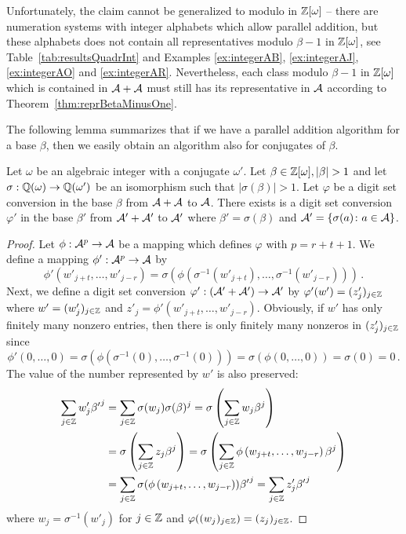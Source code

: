 Unfortunately, the claim cannot be generalized to modulo in $\mathbb{Z}[\omega]$ -- there are numeration systems with integer alphabets which allow parallel addition, but these alphabets does not contain all representatives modulo $\beta-1$ in $\mathbb{Z}[\omega]$, see Table~\ref{tab:resultsQuadrInt} and Examples \ref{ex:integerAB},  \ref{ex:integerAJ}, \ref{ex:integerAO} and \ref{ex:integerAR}. Nevertheless, each class modulo $\beta -1$ in $\mathbb{Z}[\omega]$ which is contained in $\mathcal{A}+\mathcal{A}$ must still has its representative in $\mathcal{A}$ according to Theorem~\ref{thm:reprBetaMinusOne}.

The following lemma summarizes that if we have a parallel addition algorithm for a base $\beta$, then we easily obtain an algorithm also for conjugates of $\beta$.
\begin{lem}
\label{lem:parAddAlgForConjugate}
Let $\omega$ be an algebraic integer with a conjugate $\omega'$. Let $\beta\in\Zomega, |\beta|>1$ and let $\sigma:\mathbb{Q}(\omega)\rightarrow \mathbb{Q}(\omega')$ be an isomorphism such that $|\sigma(\beta)|>1$. Let $\varphi$ be a digit set conversion  in the base $\beta$ from $\mathcal{A}+\mathcal{A}$ to $\mathcal{A}$. There exists  is a digit set conversion $\varphi'$ in the base $\beta'$ from $\mathcal{A}'+\mathcal{A}'$ to $\mathcal{A}'$ where $\beta'=\sigma(\beta)$ and $\mathcal{A}'=\{\sigma(a) \colon a\in\mathcal{A}\}$.
\end{lem}
\begin{proof}
Let $\phi:\mathcal{A}^p\rightarrow\mathcal{A}$ be a mapping which defines $\varphi$ with $p=r+t+1$. We define a mapping $\phi':\mathcal{A}^p\rightarrow \mathcal{A}$ by 
$$
\phi'(w'_{j+t}, \dots, w'_{j-r})=\sigma\left(\phi\left(\sigma^{-1}(w'_{j+t}), \dots, \sigma^{-1}(w'_{j-r})\right)\right)\,.
$$
Next, we define a digit set conversion  $\varphi':(\mathcal{A}'+\mathcal{A}')\rightarrow\mathcal{A}'$ by $\varphi'(w')=(z'_j)_{j\in\mathbb{Z}}$ where $w'=(w'_j)_{j\in\mathbb{Z}}$ and $z'_j=\phi'(w'_{j+t}, \dots, w'_{j-r})$. Obviously, if $w'$ has only finitely many nonzero entries, then there is only finitely many nonzeros in $(z'_j)_{j\in\mathbb{Z}}$   since
$$
\phi'(0, \dots, 0)=\sigma\left(\phi\left(\sigma^{-1}(0), \dots, \sigma^{-1}(0)\right)\right)=\sigma\left(\phi\left(0, \dots, 0\right)\right)=\sigma\left(0\right)=0\,.
$$
The value of the number represented by $w'$ is also preserved:
\begin{align*}
\sum_{j\in\mathbb{Z}}w'_j {\beta'}^j&=\sum_{j\in\mathbb{Z}}\sigma(w_j) \sigma(\beta)^j=\sigma\left(\sum_{j\in\mathbb{Z}}w_j\beta^j\right) \\
&=\sigma\left(\sum_{j\in\mathbb{Z}}z_j\beta^j \right)=\sigma\left(\sum_{j\in\mathbb{Z}}\phi\left(w_{j+t}, \dots,w_{j-r}\right)\beta^j\right) \\
&=\sum_{j\in\mathbb{Z}}\sigma(\phi\left(w_{j+t}, \dots,w_{j-r}\right)){\beta'}^j=\sum_{j\in\mathbb{Z}}z'_j {\beta'}^j
\end{align*}
where $w_j=\sigma^{-1}(w'_j)$ for $j\in\mathbb{Z}$ and $\varphi((w_j)_{j\in\mathbb{Z}})=(z_j)_{j\in\mathbb{Z}}$.
\end{proof}

